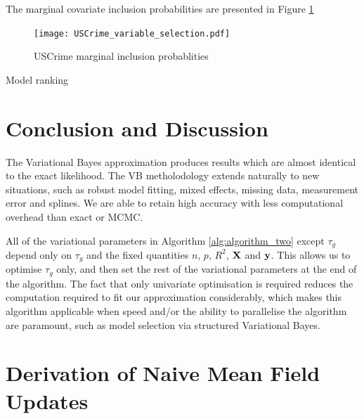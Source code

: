 \documentclass{amsart}[12pt]
\begin{document}
The marginal covariate inclusion probabilities are presented in Figure \ref{fig:USCrime_inclusion}


\begin{figure}[p]
	\label{fig:USCrime_inclusion}
	\caption{USCrime marginal inclusion probablities}
	\texttt{[image: USCrime\_variable\_selection.pdf]}
\end{figure}

Model ranking

\section{Conclusion and Discussion}
\label{sec:conclusion}

The Variational Bayes approximation produces results which are almost identical to the exact likelihood.
The VB metholodology extends naturally to new situations, such as robust model fitting, mixed effects, missing
data, measurement error and splines. We are able to retain high accuracy with less computational overhead than
exact or MCMC.

All of the variational parameters in Algorithm \ref{alg:algorithm_two} except $\tau_g$ depend only on
$\tau_g$ and the fixed quantities $n$, $p$, $R^2$, ${\bf X}$ and ${\bf y}$. This allows us to optimise $\tau_g$
only, and then set the rest of the variational parameters at the end of the algorithm. The fact that only
univariate optimisation is required reduces the computation required to fit our approximation considerably,
which makes this algorithm applicable when speed and/or the ability to parallelise the algorithm are
paramount, such as model selection via structured Variational Bayes.




\appendix
\section{Derivation of Naive Mean Field Updates}
\label{sec:appendix}
\end{document}
